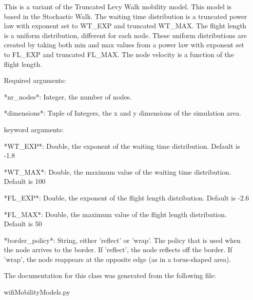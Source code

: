 \begin{DoxyVerb}This is a variant of the Truncated Levy Walk mobility model.
This model is based in the Stochastic Walk.
The waiting time distribution is a truncated power law with exponent set to WT_EXP and truncated WT_MAX.
The flight length is a uniform distribution, different for each node. These uniform distributions are 
created by taking both min and max values from a power law with exponent set to FL_EXP and truncated FL_MAX.
The node velocity is a function of the flight length.

Required arguments:

  *nr_nodes*:
    Integer, the number of nodes.
  
  *dimensions*:
    Tuple of Integers, the x and y dimensions of the simulation area.
  
keyword arguments:

  *WT_EXP*:
    Double, the exponent of the waiting time distribution. Default is -1.8
    
  *WT_MAX*:
    Double, the maximum value of the waiting time distribution. Default is 100

  *FL_EXP*:
    Double, the exponent of the flight length distribution. Default is -2.6
    
  *FL_MAX*:
    Double, the maximum value of the flight length distribution. Default is 50
    
  *border_policy*:
    String, either 'reflect' or 'wrap'. The policy that is used when the node arrives to the border.
    If 'reflect', the node reflects off the border.
    If 'wrap', the node reappears at the opposite edge (as in a torus-shaped area).
\end{DoxyVerb}
 

The documentation for this class was generated from the following file\-:\begin{DoxyCompactItemize}
\item 
wifi\-Mobility\-Models.\-py\end{DoxyCompactItemize}
